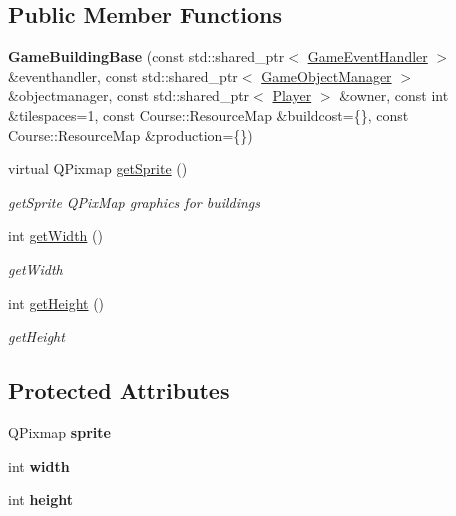 \subsection*{Public Member Functions}
\begin{DoxyCompactItemize}
\item 
\hypertarget{class_game_1_1_game_building_base_a715b5d8f912a668a3e65c5357d524f66}{{\bfseries Game\-Building\-Base} (const std\-::shared\-\_\-ptr$<$ \hyperlink{class_game_1_1_game_event_handler}{Game\-Event\-Handler} $>$ \&eventhandler, const std\-::shared\-\_\-ptr$<$ \hyperlink{class_game_1_1_game_object_manager}{Game\-Object\-Manager} $>$ \&objectmanager, const std\-::shared\-\_\-ptr$<$ \hyperlink{class_game_1_1_player}{Player} $>$ \&owner, const int \&tilespaces=1, const Course\-::\-Resource\-Map \&buildcost=\{\}, const Course\-::\-Resource\-Map \&production=\{\})}\label{class_game_1_1_game_building_base_a715b5d8f912a668a3e65c5357d524f66}

\item 
virtual Q\-Pixmap \hyperlink{class_game_1_1_game_building_base_a8eacd371cae363d396accefb637b04b6}{get\-Sprite} ()
\begin{DoxyCompactList}\small\item\em get\-Sprite Q\-Pix\-Map graphics for buildings \end{DoxyCompactList}\item 
int \hyperlink{class_game_1_1_game_building_base_a5d20b7f0aac3ccbc671c25911a7cd9a1}{get\-Width} ()
\begin{DoxyCompactList}\small\item\em get\-Width \end{DoxyCompactList}\item 
int \hyperlink{class_game_1_1_game_building_base_ac1a873f44dd45d52a919e7638c07498e}{get\-Height} ()
\begin{DoxyCompactList}\small\item\em get\-Height \end{DoxyCompactList}\end{DoxyCompactItemize}
\subsection*{Protected Attributes}
\begin{DoxyCompactItemize}
\item 
\hypertarget{class_game_1_1_game_building_base_a0e218fa83174063e74574ad12a0c9d13}{Q\-Pixmap {\bfseries sprite}}\label{class_game_1_1_game_building_base_a0e218fa83174063e74574ad12a0c9d13}

\item 
\hypertarget{class_game_1_1_game_building_base_a0a56d68ac3f8d437aef06671ce9a19c6}{int {\bfseries width}}\label{class_game_1_1_game_building_base_a0a56d68ac3f8d437aef06671ce9a19c6}

\item 
\hypertarget{class_game_1_1_game_building_base_a1502712620fb26a336d10de32977438e}{int {\bfseries height}}\label{class_game_1_1_game_building_base_a1502712620fb26a336d10de32977438e}

\end{DoxyCompactItemize}


